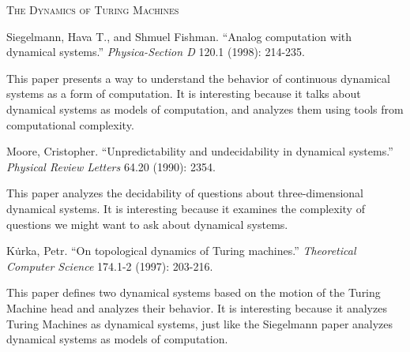 \documentclass {fkpset}
\begin{document}
	
	\begin{center}
		\vspace{-2.0cm}
		\scshape \LARGE The Dynamics of Turing Machines
		\vspace{1.05cm}
	\end{center}
	
	
	\begin{thebibliography}{widestlabel}
		Siegelmann, Hava T., and Shmuel Fishman. ``Analog computation with dynamical systems.'' \textit{Physica-Section D} 120.1 (1998): 214-235.
		
		This paper presents a way to understand the behavior of continuous dynamical systems as a form of computation. It is interesting because it talks about dynamical systems as models of computation, and analyzes them using tools from computational complexity.
	
		Moore, Cristopher. ``Unpredictability and undecidability in dynamical systems.'' 
		\textit{Physical Review Letters} 64.20 (1990): 2354.
		
		This paper analyzes the decidability of questions about three-dimensional dynamical systems. It is interesting because it examines the complexity of questions we might want to ask about dynamical systems.
		
		K{\.u}rka, Petr. ``On topological dynamics of Turing machines.'' \textit{Theoretical Computer Science} 174.1-2 (1997): 203-216.
		
		This paper defines two dynamical systems based on the motion of the Turing Machine head and analyzes their behavior. It is interesting because it analyzes Turing Machines as dynamical systems, just like the Siegelmann paper analyzes dynamical systems as models of computation. 
		
		
		
	\end{thebibliography}
	
\end{document}
